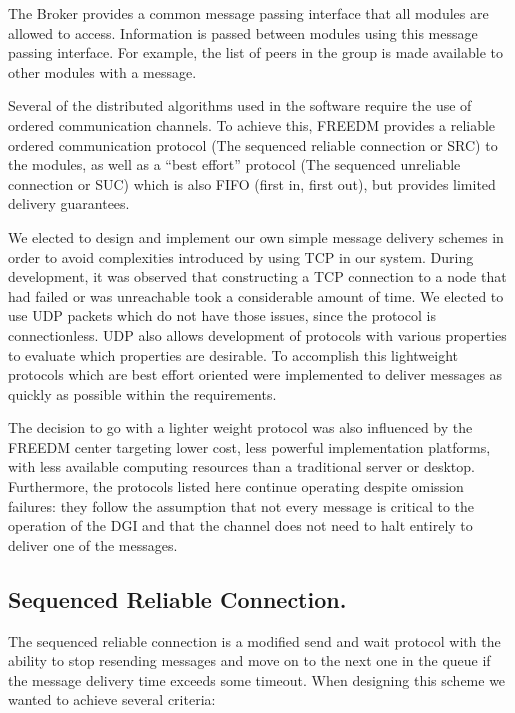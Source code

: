 The Broker provides a common message passing interface that all modules are
allowed to access. Information is passed between modules using this message
passing interface. For example, the list of peers in the group is made available
to other modules with a message.

Several of the distributed algorithms used in the software require the use of
ordered communication channels. To achieve this, FREEDM provides a reliable
ordered communication protocol (The sequenced reliable connection or SRC) to
the modules, as well as a ``best effort'' protocol (The sequenced unreliable
connection or SUC) which is also FIFO (first in, first out), but provides
limited delivery guarantees.

We elected to design and implement our own simple message delivery schemes in
order to avoid complexities introduced by using TCP in our system. During
development, it was observed that constructing a TCP connection to a node that
had failed or was unreachable took a considerable amount of time. We elected to
use UDP packets which do not have those issues, since the protocol is
connectionless. UDP also allows development of protocols with various
properties to evaluate which properties are desirable. To accomplish this
lightweight protocols which are best effort oriented were implemented to
deliver messages as quickly as possible within the requirements.

The decision to go with a lighter weight protocol was also influenced by the
FREEDM center targeting lower cost, less powerful implementation platforms, with less
available computing resources than a traditional server or desktop.
Furthermore, the protocols listed here continue operating despite omission
failures: they follow the assumption that not every message is critical to the
operation of the DGI and that the channel does not need to halt entirely to
deliver one of the messages.

\subsection{Sequenced Reliable Connection.}

The sequenced reliable connection is a modified send and wait protocol with the 
ability to stop resending messages and move on to the next one in the queue if 
the message delivery time exceeds some timeout. When designing this scheme we
wanted to achieve several criteria:

